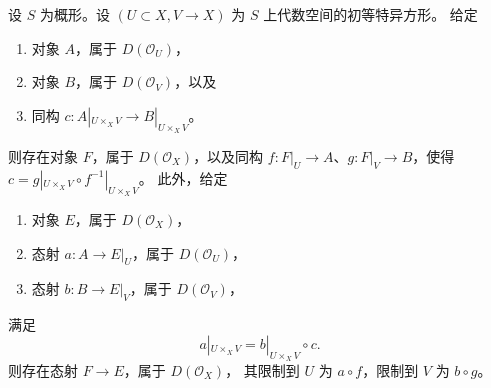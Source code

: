\begin{lemma}
\label{lemma-glue}
设 $S$ 为概形。设 $(U \subset X, V \to X)$ 为 $S$ 上代数空间的初等特异方形。
给定
\begin{enumerate}
\item 对象 $A$，属于 $D(\mathcal{O}_U)$，
\item 对象 $B$，属于 $D(\mathcal{O}_V)$，以及
\item 同构 $c : A|_{U \times_X V} \to B|_{U \times_X V}$。
\end{enumerate}
则存在对象 $F$，属于 $D(\mathcal{O}_X)$，以及同构
$f : F|_U \to A$、$g : F|_V \to B$，使得
$c = g|_{U \times_X V} \circ f^{-1}|_{U \times_X V}$。
此外，给定
\begin{enumerate}
\item 对象 $E$，属于 $D(\mathcal{O}_X)$，
\item 态射 $a : A \to E|_U$，属于 $D(\mathcal{O}_U)$，
\item 态射 $b : B \to E|_V$，属于 $D(\mathcal{O}_V)$，
\end{enumerate}
满足
$$
a|_{U \times_X V}  = b|_{U \times_X V} \circ c.
$$
则存在态射 $F \to E$，属于 $D(\mathcal{O}_X)$，
其限制到 $U$ 为 $a \circ f$，限制到 $V$ 为 $b \circ g$。
\end{lemma}

